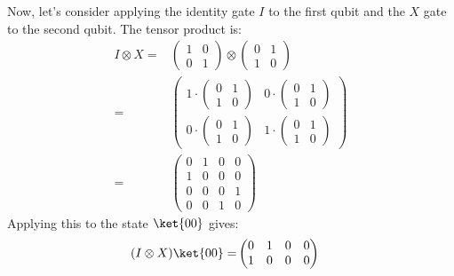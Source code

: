 \begin{examplebox}[: $I \otimes X$]
    Now, let's consider applying the identity gate $I$ to the first qubit and the $X$ gate to the second qubit. The tensor product is:
    \begin{align*}
        I \otimes X =& \begin{pmatrix}
            1 & 0 \\
            0 & 1
        \end{pmatrix} \otimes \begin{pmatrix}
            0 & 1 \\
            1 & 0
        \end{pmatrix} \\
        =&
        \begin{pmatrix}
            1 \cdot \begin{pmatrix}
                0 & 1 \\
                1 & 0
            \end{pmatrix} & 0 \cdot \begin{pmatrix}
                0 & 1 \\
                1 & 0
            \end{pmatrix} \\
            0 \cdot \begin{pmatrix}
                0 & 1 \\
                1 & 0
            \end{pmatrix} & 1 \cdot \begin{pmatrix}
                0 & 1 \\
                1 & 0
            \end{pmatrix}
        \end{pmatrix} \\
        =& \begin{pmatrix}
            0 & 1 & 0 & 0 \\
            1 & 0 & 0 & 0 \\
            0 & 0 & 0 & 1 \\
            0 & 0 & 1 & 0
        \end{pmatrix}
    \end{align*}
    Applying this to the state $\ket{00}$ gives:
    \begin{align*}
        (I \otimes X)\ket{00} =& \begin{pmatrix}
            0 & 1 & 0 & 0 \\
            1 & 0 & 0 & 0 \\

\end{pmatrix}
\end{align*}
\end{examplebox}
